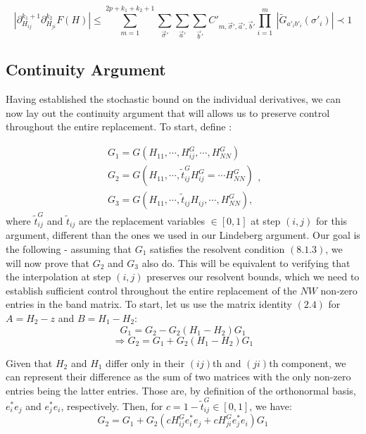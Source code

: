 \documentclass[11pt]{article}
\begin{document}
$$\left\vert\partial_{H_{ij}}^{k_1+1}\partial_{H_{ji}}^{k_2} F(H)\right\vert \leq  \sum_{m=1}^{2p+k_1+k_2+1} \sum_{\vec\sigma'}\sum_{\vec a'}\sum_{\vec b'} C'_{m, \vec\sigma', \vec a', \vec b'} \prod_{i=1}^m\ \left\vert\tilde{G}_{a'_i b'_i}(\sigma'_i)\right\vert\prec 1$$

\subsection{Continuity Argument}
\noindent Having established the stochastic bound on the individual derivatives, we can now lay out the continuity argument that will allows us to preserve control throughout the entire replacement. To start, define : 

\begin{equation*}
\begin{array}{c}
G_1 = G\left(H_{11}, \cdots, H_{ij}^G, \cdots, H_{NN}^G\right)\\
G_2 = G\left(H_{11}, \cdots,\tilde{t}_{ij}^G H_{ij}^G=\cdots H_{NN}^G\right) \\
G_3 = G\left(H_{11}, \cdots,\tilde{t}_{ij} H_{ij}, \cdots, H_{NN}^G\right),
\end{array},
\end{equation*}
where $\tilde{t}_{ij}^G$ and $\tilde{t}_{ij}$ are the replacement variables $\in [0, 1]$ at step $(i,j)$ for this argument, different than the ones we used in our Lindeberg argument. Our goal is the following - assuming that $G_1$ satisfies the resolvent condition $(8.1.3)$, we will now prove that $G_2$ and $G_3$ also do. This will be equivalent to verifying that the interpolation at step $(i,j)$ preserves our resolvent bounds, which we need to establish sufficient control throughout the entire replacement of the $NW$ non-zero entries in the band matrix. To start, let us use the matrix identity $(2.4)$ for $A = H_2-z$ and $B = H_1-H_2$:
$$G_1 = G_2 - G_2\left(H_1-H_2\right)G_1$$
$$\Rightarrow G_2 = G_1+G_2\left(H_1-H_2\right)G_1$$

\noindent Given that $H_2$ and $H_1$ differ only in their $(ij)$th and $(ji)$th component, we can represent their difference as the sum of two matrices with the only non-zero entries being the latter entries. Those are, by definition of the orthonormal basis, $e_i^*e_j$ and $e_j^*e_i$, respectively. Then, for $c = 1-\tilde{t}_{ij}^G\in [0, 1]$, we have:
\begin{equation*}
G_2= G_1 + G_2\left(cH_{ij}^Ge_i^*e_j+ cH_{ji}^G e_j^*e_i\right)G_1
\end{equation*}
\end{document}
